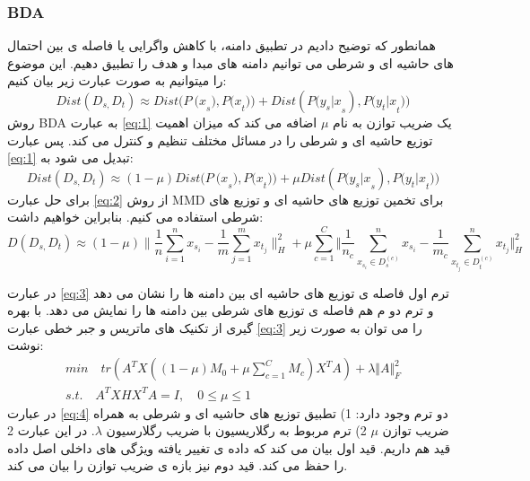 {{ 	\subsubsection{BDA}
 	{
 		همانطور که توضیح دادیم در تطبیق دامنه، با کاهش واگرایی یا فاصله ی بین احتمال های حاشیه ای و شرطی می توانیم دامنه های مبدا و هدف را تطبیق دهیم. این موضوع را میتوانیم به صورت عبارت زیر بیان کنیم:
 		\begin{equation}
 			Dist\left(D_{s,}D_t\right)\approx Dist{(P\ (x}_s),{P(x}_t))+Dist({P(y_s|x}_s),{P(y_t|x}_t))
 			\label{eq:1}
 		\end{equation}
 		روش BDA به عبارت 
 		\ref{eq:1}
 		 یک ضریب توازن به نام $\mu$ اضافه می کند که میزان اهمیت توزیع حاشیه ای و شرطی را در مسائل مختلف تنظیم و کنترل می کند. پس عبارت 
 		 \ref{eq:1}
 		 تبدیل می شود به:
 		 \begin{equation}
 			Dist\left(D_{s,}D_t\right)\approx(1-\mu)Dist{(P\ (x}_s),{P(x}_t))+\mu Dist({P(y_s|x}_s),{P(y_t|x}_t))
 			\label{eq:2}
 		 \end{equation}
 		  برای حل عبارت 
 		  \ref{eq:2}
 		  از روش MMD برای تخمین توزیع های حاشیه ای و توزیع های شرطی استفاده می کنیم. بنابراین خواهیم داشت:
 		  \begin{equation}
 		  	 D \left( D_{s,}D_{t} \right)  \approx  \left( 1- \mu  \right)  \bigg \|\frac{1}{n} \sum _{i=1}^{n}x_{s_{i}} - \frac{1}{m} \sum _{j=1}^{m}x_{t_{j}}\bigg \| _{H}^{2} + \mu \sum _{c=1}^{C} \bigg \Vert \frac{1}{n_{c}} \sum _{x_{s_{i}} \in  D_{s}^{ \left( c \right) }}^{n}x_{s_{i}} - \frac{1}{m_{c}} \sum _{x_{t_{j}} \in  D_{t}^{ \left( c \right) }}^{n}x_{t_{j}} \bigg \Vert _{H}^{2}
 		  	 \label{eq:3}
 		  \end{equation}
 		  
 		  در عبارت 
 		 \ref{eq:3}
 		  ترم اول فاصله ی توزیع های حاشیه ای بین دامنه ها را نشان می دهد و ترم دو م هم  فاصله ی توزیع های شرطی بین دامنه ها را نمایش می دهد. با بهره گیری از تکنیک های ماتریس و جبر خطی عبارت 
 		 \ref{eq:3}
 		  را می توان به صورت زیر نوشت:
 		  \begin{equation}
	 	  \begin{aligned}
		  min \quad tr \left( A^{T}X \left( \left( 1 - \mu \right) M_{0} + \mu \sum _{c=1\mathrm{ }}^{C}M_{c} \right) X^{T}A \right) + \lambda \Vert A \Vert_{F}^{2} \\
		  s.t. \quad A^{T}XHX^{T}A = I, \quad  0  \leq \mu \leq  1 \quad \quad \quad \quad \quad
		  \label{eq:4}
	 	  \end{aligned}
 		  \end{equation}
 		   در عبارت
 		   \ref{eq:4}
 		    دو ترم وجود دارد: 1) تطبیق توزیع های حاشیه ای و شرطی به همراه ضریب توازن $\mu$ 2) ترم مربوط به رگلاریسیون با ضریب رگلارسیون $\lambda$. در این عبارت 2 قید هم داریم. قید اول بیان می کند که داده ی تغییر یافته ویژگی های داخلی اصل داده را حفظ می کند. قید دوم نیز بازه ی ضریب توازن را بیان می کند.
 		    
}}}
